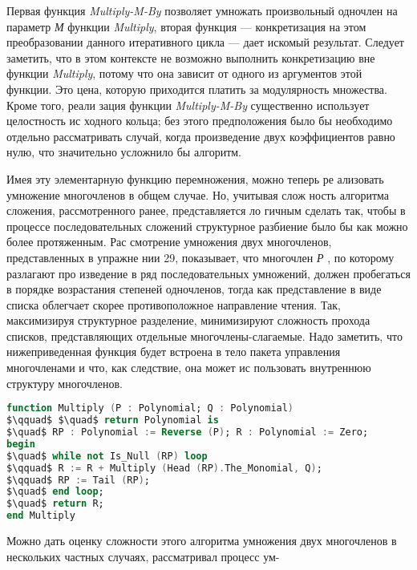 
\par Первая функция {\it Multiply-M-By} позволяет умножать произвольный
одночлен на параметр {\it М} функции {\it Multiply}, вторая функция — 
конкретизация на этом преобразовании данного итеративного цикла —
дает искомый результат. Следует заметить, что в этом контексте не­
возможно выполнить конкретизацию вне функции {\it Multiply}, потому что
она зависит от одного из аргументов этой функции. Это цена, которую
приходится платить за модулярность множества. Кроме того, реали­
зация функции {\it Multiply-M-By} существенно использует целостность ис­
ходного кольца; без этого предположения было бы необходимо отдельно
рассматривать случай, когда произведение двух коэффициентов равно
нулю, что значительно усложнило бы алгоритм.
\par Имея эту элементарную функцию перемножения, можно теперь ре­
ализовать умножение многочленов в общем случае. Но, учитывая слож­
ность алгоритма сложения, рассмотренного ранее, представляется ло­
гичным сделать так, чтобы в процессе последовательных сложений
структурное разбиение было бы как можно более протяженным. Рас­
смотрение умножения двух многочленов, представленных в упражне­
нии 29, показывает, что многочлен {\it Р} , по которому разлагают про­
изведение в ряд последовательных умножений, должен пробегаться в
порядке возрастания степеней одночленов, тогда как представление в
виде списка облегчает скорее противоположное направление чтения.
Так, максимизируя структурное разделение, минимизируют сложность
прохода списков, представляющих отдельные многочлены-слагаемые.
Надо заметить, что нижеприведенная функция будет встроена в тело
пакета управления многочленами и что, как следствие, она может ис­
пользовать внутреннюю структуру многочленов.

\begin{lstlisting}[mathescape=true, language=Ada, basicstyle=\small]
function Multiply (P : Polynomial; Q : Polynomial)
$\qquad$ $\quad$ return Polynomial is
$\quad$ RP : Polynomial := Reverse (P); R : Polynomial := Zero;
begin
$\quad$ while not Is_Null (RP) loop
$\qquad$ R := R + Multiply (Head (RP).The_Monomial, Q);
$\qquad$ RP := Tail (RP);
$\quad$ end loop;
$\quad$ return R;
end Multiply
\end{lstlisting}

\par Можно дать оценку сложности этого алгоритма умножения двух
многочленов в нескольких частных случаях, рассматривал процесс ум-
\newpage


